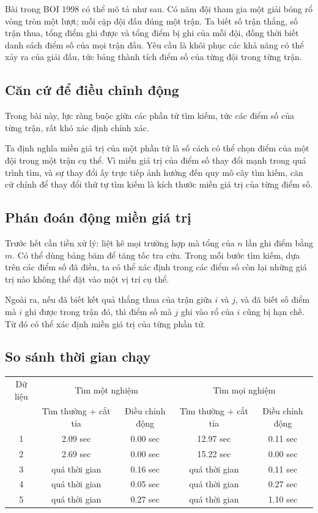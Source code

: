 \documentclass[11pt]{article}
\begin{document}
Bài  trong BOI 1998 có thể mô tả như sau. Có
năm đội tham gia một giải bóng rổ vòng tròn một lượt; mỗi cặp đội đấu đúng
một trận. Ta biết số trận thắng, số trận thua, tổng điểm ghi được và tổng
điểm bị ghi của mỗi đội, đồng thời biết danh sách điểm số của mọi trận đấu.
Yêu cầu là khôi phục các khả năng có thể xảy ra của giải đấu, tức bảng thành
tích điểm số của từng đội trong từng trận.

\subsection{Căn cứ để điều chỉnh động}

Trong bài này, lực ràng buộc giữa các phần tử tìm kiếm, tức các điểm số của
từng trận, rất khó xác định chính xác.

Ta định nghĩa miền giá trị của một phần tử là số cách có thể chọn điểm của
một đội trong một trận cụ thể. Vì miền giá trị của điểm số thay đổi mạnh trong
quá trình tìm, và sự thay đổi ấy trực tiếp ảnh hưởng đến quy mô cây tìm kiếm,
căn cứ chính để thay đổi thứ tự tìm kiếm là kích thước miền giá trị của từng
điểm số.

\subsection{Phán đoán động miền giá trị}

Trước hết cần tiền xử lý: liệt kê mọi trường hợp mà tổng của \(n\) lần ghi
điểm bằng \(m\). Có thể dùng bảng băm để tăng tốc tra cứu. Trong mỗi bước tìm
kiếm, dựa trên các điểm số đã điền, ta có thể xác định trong các điểm số còn
lại những giá trị nào không thể đặt vào một vị trí cụ thể.

Ngoài ra, nếu đã biết kết quả thắng thua của trận giữa \(i\) và \(j\), và đã
biết số điểm mà \(i\) ghi được trong trận đó, thì điểm số mà \(j\) ghi vào
rổ của \(i\) cũng bị hạn chế. Từ đó có thể xác định miền giá trị của từng
phần tử.

\subsection{So sánh thời gian chạy}

\begin{center}
\begin{tabular}{c|cc|cc}
\hline
Dữ liệu &
\multicolumn{2}{c|}{Tìm một nghiệm} &
\multicolumn{2}{c}{Tìm mọi nghiệm} \\
 & Tìm thường + cắt tỉa & Điều chỉnh động
 & Tìm thường + cắt tỉa & Điều chỉnh động \\
\hline
1 & 2.09 sec & 0.00 sec & 12.97 sec & 0.11 sec \\
2 & 2.69 sec & 0.00 sec & 15.22 sec & 0.00 sec \\
3 & quá thời gian & 0.16 sec & quá thời gian & 0.11 sec \\
4 & quá thời gian & 0.05 sec & quá thời gian & 0.27 sec \\
5 & quá thời gian & 0.27 sec & quá thời gian & 1.10 sec \\
\hline
\end{tabular}
\end{center}
\end{document}
